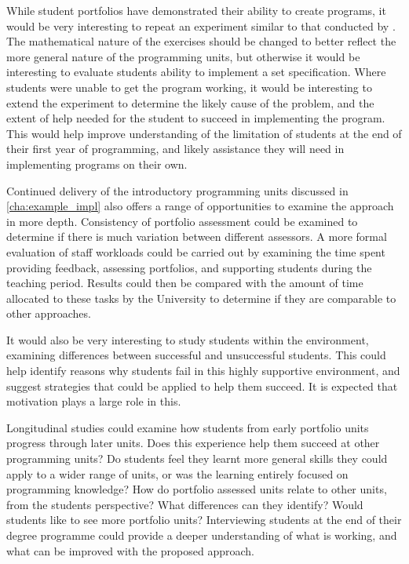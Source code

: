 While student portfolios have demonstrated their ability to create programs, it would be very interesting to repeat an experiment similar to that conducted by \citet{McCracken:2001}. The mathematical nature of the exercises should be changed to better reflect the more general nature of the programming units, but otherwise it would be interesting to evaluate students ability to implement a set specification. Where students were unable to get the program working, it would be interesting to extend the experiment to determine the likely cause of the problem, and the extent of help needed for the student to succeed in implementing the program. This would help improve understanding of the limitation of students at the end of their first year of programming, and likely assistance they will need in implementing programs on their own. 

Continued delivery of the introductory programming units discussed in \cref{cha:example_impl} also offers a range of opportunities to examine the approach in more depth. Consistency of portfolio assessment could be examined to determine if there is much variation between different assessors. A more formal evaluation of staff workloads could be carried out by examining the time spent providing feedback, assessing portfolios, and supporting students during the teaching period. Results could then be compared with the amount of time allocated to these tasks by the University to determine if they are comparable to other approaches.

It would also be very interesting to study students within the environment, examining differences between successful and unsuccessful students. This could help identify reasons why students fail in this highly supportive environment, and suggest strategies that could be applied to help them succeed. It is expected that motivation plays a large role in this.


Longitudinal studies could examine how students from early portfolio units progress through later units. Does this experience help them succeed at other programming units? Do students feel they learnt more general skills they could apply to a wider range of units, or was the learning entirely focused on programming knowledge? How do portfolio assessed units relate to other units, from the students perspective? What differences can they identify? Would students like to see more portfolio units? Interviewing students at the end of their degree programme could provide a deeper understanding of what is working, and what can be improved with the proposed approach.

